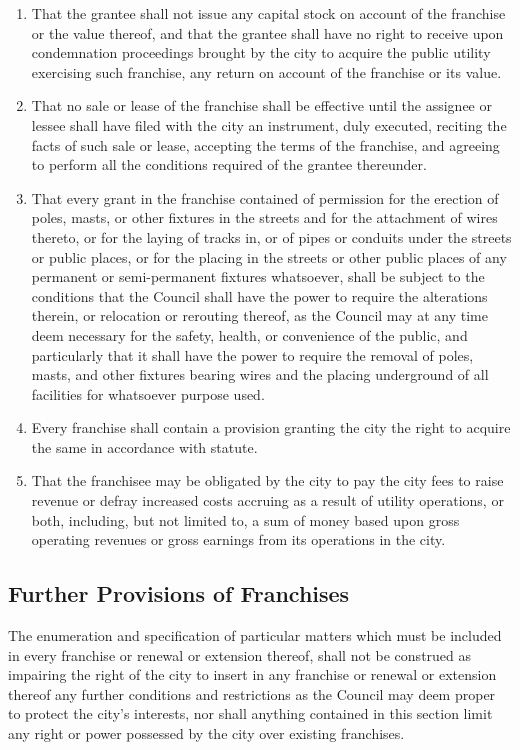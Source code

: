 \begin{enumerate}
    \item That the grantee shall not issue any capital stock on account of the franchise or the value thereof, and that the grantee shall have no right to receive upon condemnation proceedings brought by the city to acquire the public utility exercising such franchise, any return on account of the franchise or its value.
    \item That no sale or lease of the franchise shall be effective until the assignee or lessee shall have filed with the city an instrument, duly executed, reciting the facts of such sale or lease, accepting the terms of the franchise, and agreeing to perform all the conditions required of the grantee thereunder.
    \item That every grant in the franchise contained of permission for the erection of poles, masts, or other fixtures in the streets and for the attachment of wires thereto, or for the laying of tracks in, or of pipes or conduits under the streets or public places, or for the placing in the streets or other public places of any permanent or semi-permanent fixtures whatsoever, shall be subject to the conditions that the Council shall have the power to require the alterations therein, or relocation or rerouting thereof, as the Council may at any time deem necessary for the safety, health, or convenience of the public, and particularly that it shall have the power to require the removal of poles, masts, and other fixtures bearing wires and the placing underground of all facilities for whatsoever purpose used.
    \item Every franchise shall contain a provision granting the city the right to acquire the same in accordance with statute.
    \item That the franchisee may be obligated by the city to pay the city fees to raise revenue or defray increased costs accruing as a result of utility operations, or both, including, but not limited to, a sum of money based upon gross operating revenues or gross earnings from its operations in the city.
\end{enumerate}
\subsection{Further Provisions of Franchises}
The enumeration and specification of particular matters which must be included in every franchise or renewal or extension thereof, shall not be construed as impairing the right of the city to insert in any franchise or renewal or extension thereof any further conditions and restrictions as the Council may deem proper to protect the city’s interests, nor shall anything contained in this section limit any right or power possessed by the city over existing franchises.

